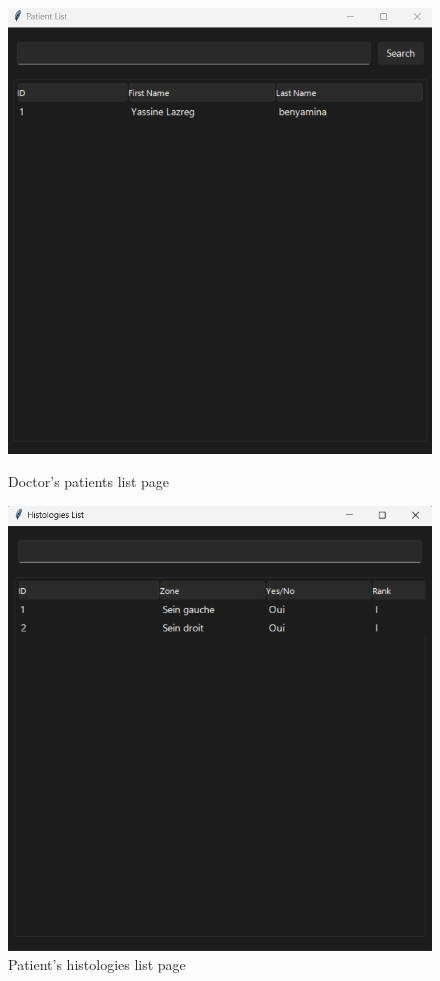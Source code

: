 \documentclass[
11pt, %
english, %
singlespacing, %
headsepline, %
]{project_structure}
\begin{document}
\begin{figure}[H]
    \centering
    \begin{minipage}{0.49\textwidth}
        \centering
        \includegraphics[width=1\linewidth]{figures/SI/desktop/patient_list.png}
        \caption{Doctor's patients list page}
        \label{fig:app_patient_list}
    \end{minipage}
    \hfill
    \begin{minipage}{0.49\textwidth}
        \centering
        \includegraphics[width=1\linewidth]{figures/SI/desktop/histo_list.png}
        \caption{Patient's histologies list page}
        \label{fig:app_histo_list}
    \end{minipage}
\end{figure}
\end{document}
